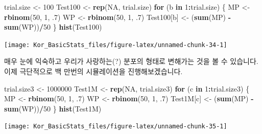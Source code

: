 \documentclass[]{book}
\newenvironment{Shaded}{\begin{snugshade}}{\end{snugshade}}
\newcommand{\ControlFlowTok}[1]{\textcolor[rgb]{0.13,0.29,0.53}{\textbf{#1}}}
\newcommand{\DecValTok}[1]{\textcolor[rgb]{0.00,0.00,0.81}{#1}}
\newcommand{\FloatTok}[1]{\textcolor[rgb]{0.00,0.00,0.81}{#1}}
\newcommand{\KeywordTok}[1]{\textcolor[rgb]{0.13,0.29,0.53}{\textbf{#1}}}
\newcommand{\NormalTok}[1]{#1}
\newcommand{\OperatorTok}[1]{\textcolor[rgb]{0.81,0.36,0.00}{\textbf{#1}}}
\newcommand{\OtherTok}[1]{\textcolor[rgb]{0.56,0.35,0.01}{#1}}
\newcommand{\StringTok}[1]{\textcolor[rgb]{0.31,0.60,0.02}{#1}}
\begin{document}
\begin{Shaded}
\begin{Highlighting}[]
\NormalTok{trial.size <-}\StringTok{ }\DecValTok{100}
\NormalTok{Test100 <-}\StringTok{ }\KeywordTok{rep}\NormalTok{(}\OtherTok{NA}\NormalTok{, trial.size)}
\ControlFlowTok{for}\NormalTok{ (b }\ControlFlowTok{in} \DecValTok{1}\OperatorTok{:}\NormalTok{trial.size) \{}
\NormalTok{  MP <-}\StringTok{ }\KeywordTok{rbinom}\NormalTok{(}\DecValTok{50}\NormalTok{, }\DecValTok{1}\NormalTok{, }\FloatTok{.7}\NormalTok{)}
\NormalTok{  WP <-}\StringTok{ }\KeywordTok{rbinom}\NormalTok{(}\DecValTok{50}\NormalTok{, }\DecValTok{1}\NormalTok{, }\FloatTok{.7}\NormalTok{)}
\NormalTok{  Test100[b] <-}\StringTok{ }\NormalTok{(}\KeywordTok{sum}\NormalTok{(MP) }\OperatorTok{-}\StringTok{ }\KeywordTok{sum}\NormalTok{(WP))}\OperatorTok{/}\DecValTok{50}
\NormalTok{\}}
\KeywordTok{hist}\NormalTok{(Test100)}
\end{Highlighting}
\end{Shaded}

\begin{center}\texttt{[image: Kor\_BasicStats\_files/figure-latex/unnamed-chunk-34-1]} \end{center}

매우 눈에 익숙하고 우리가 사랑하는(?) 분포의 형태로 변해가는 것을 볼 수 있습니다. 이제 극단적으로 백 만번의 시뮬레이션을 진행해보겠습니다.

\begin{Shaded}
\begin{Highlighting}[]
\NormalTok{trial.size3 <-}\StringTok{ }\DecValTok{1000000}
\NormalTok{Test1M <-}\StringTok{ }\KeywordTok{rep}\NormalTok{(}\OtherTok{NA}\NormalTok{, trial.size3)}
\ControlFlowTok{for}\NormalTok{ (c }\ControlFlowTok{in} \DecValTok{1}\OperatorTok{:}\NormalTok{trial.size3) \{}
\NormalTok{  MP <-}\StringTok{ }\KeywordTok{rbinom}\NormalTok{(}\DecValTok{50}\NormalTok{, }\DecValTok{1}\NormalTok{, }\FloatTok{.7}\NormalTok{)}
\NormalTok{  WP <-}\StringTok{ }\KeywordTok{rbinom}\NormalTok{(}\DecValTok{50}\NormalTok{, }\DecValTok{1}\NormalTok{, }\FloatTok{.7}\NormalTok{)}
\NormalTok{  Test1M[c] <-}\StringTok{ }\NormalTok{(}\KeywordTok{sum}\NormalTok{(MP) }\OperatorTok{-}\StringTok{ }\KeywordTok{sum}\NormalTok{(WP))}\OperatorTok{/}\DecValTok{50}
\NormalTok{\}}
\KeywordTok{hist}\NormalTok{(Test1M)}
\end{Highlighting}
\end{Shaded}

\begin{center}\texttt{[image: Kor\_BasicStats\_files/figure-latex/unnamed-chunk-35-1]} \end{center}
\end{document}
